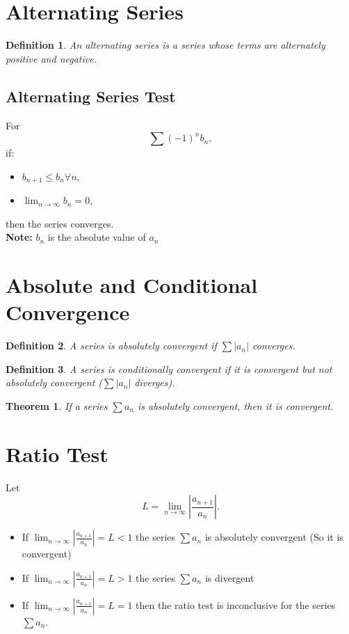 \documentclass[11pt]{article}
\newtheorem{theorem}{Theorem}[section]
\theoremstyle{mydef}
\newtheorem{definition}{Definition}
\begin{document}
\section*{Alternating Series}

\begin{definition}
    An \textit{alternating series} is a series whose terms are alternately positive and negative.
\end{definition}

\subsection*{Alternating Series Test}
For
\[
\sum (-1)^n b_n,
\]
if:
\begin{itemize}
\item $b_{n+1}\leq b_n \forall n$,
\item $\lim_{n \to \infty} b_n = 0$,
\end{itemize}
then the series converges.\\
\textbf{Note:} $b_n$ is the absolute value of $a_n$


\section*{Absolute and Conditional Convergence}

\begin{definition}
    A series is \textit{absolutely convergent} if $\sum |a_n|$ converges.
\end{definition}
\begin{definition}
    A series is \textit{conditionally convergent} if it is convergent but not absolutely convergent ($\sum |a_n|$ diverges).
\end{definition}

\begin{theorem}
If a series $\sum a_n$ is absolutely convergent, then it is convergent.
\end{theorem}


\section*{Ratio Test}

Let
\[
L=\lim_{n\to\infty}\left|\frac{a_{n+1}}{a_n}\right|.
\]

\begin{itemize}
\item If $\lim_{n\to\infty}\left|\frac{a_{n+1}}{a_n}\right|=L<1$ the series $\sum a_n$ is absolutely convergent (So it is convergent)
\item If $\lim_{n\to\infty}\left|\frac{a_{n+1}}{a_n}\right|=L>1$ the series $\sum a_n$ is divergent
\item If $\lim_{n\to\infty}\left|\frac{a_{n+1}}{a_n}\right|=L=1$ then the ratio test is inconclusive for the series $\sum a_n$.
\end{itemize}
\end{document}

